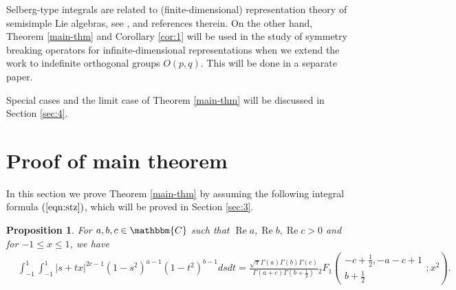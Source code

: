 \documentclass[12pt]{article}
\numberwithin{equation}{section}
\newcommand{\tmop}[1]{\ensuremath{\operatorname{#1}}}
\newtheorem{proposition}[corollary]{Proposition}
{\theorembodyfont{\rmfamily}\newtheorem{remark}[corollary]{Remark}}
\begin{document}
Selberg-type integrals are related to (finite-dimensional) representation
theory of semisimple Lie algebras, see {\cite{forrester2008importance}},
{\cite{tarasov2003selberg}} and references therein. On the other hand, Theorem
\ref{main-thm} and Corollary \ref{cor:1} will be used in the study of symmetry
breaking operators for infinite-dimensional representations when we extend the
work {\cite{kobayashi2015symmetry}} to indefinite orthogonal groups $O (p,
q)$. This will be done in a separate paper.

Special cases and the limit case of Theorem \ref{main-thm} will be discussed
in Section \ref{sec:4}.

\section{Proof of main theorem}\label{sec:2}

In this section we prove Theorem \ref{main-thm} by assuming the following
integral formula $(\ref{eqn:stz})$, which will be proved in Section
\ref{sec:3}.

\begin{proposition}
  \label{prop:2}For $a, b, c \in \mathbbm{C}$ such that $\tmop{Re} a,
  \tmop{Re} b, \tmop{Re} c > 0$ and for $- 1 \leqslant x \leqslant 1$, we have
  \begin{eqnarray}
    & \displaystyle\int_{- 1}^1 \displaystyle\int_{- 1}^1 | s + t x |^{2 c - 1} (1 - s^2)^{a - 1} (1 -
    t^2)^{b - 1} d s d t = \frac{\sqrt{\pi} \Gamma (a) \Gamma (b) \Gamma
    (c)}{\Gamma (a + c) \Gamma \left( b + \frac{1}{2} \right)}{}_2 F_1 \left(
    \begin{array}{c}
      - c + \frac{1}{2}, - a - c + 1\\
      b + \frac{1}{2}
    \end{array} ; x^2 \right) .  \label{eqn:stz} & \\
    &  &  \nonumber
  \end{eqnarray}
\end{proposition}
\end{document}
